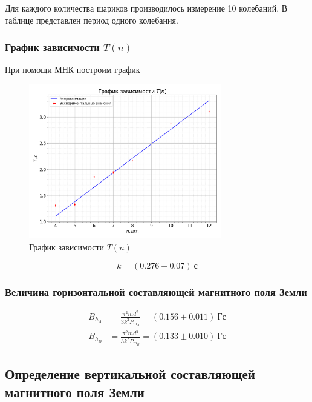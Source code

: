 \documentclass[a4paper, 12pt]{article}
\begin{document}
                Для каждого количества шариков производилось измерение 10 колебаний. В таблице представлен период одного колебания.

            \subsubsection{График зависимости $T(n)$}

                При помощи МНК построим график

                \begin{figure}[!ht]
                    \centering
                    \includegraphics[width=0.75\textwidth]{img/horizontal.png}
                    \caption{График зависимости $T(n)$}
                    \label{plot:n_T_horizontal}
                \end{figure}

                $$
                    k = (0.276 \pm 0.07)~с
                $$

            \subsubsection{Величина горизонтальной составляющей магнитного поля Земли}

                \begin{align*}
                    B_{h_A} &= \frac{\pi^2md^2}{3k^2P_{m_A}} = (0.156 \pm 0.011)~Гс \\
                    B_{h_B} &= \frac{\pi^2md^2}{3k^2P_{m_B}} = (0.133 \pm 0.010)~Гс
                \end{align*}

        \subsection{Определение вертикальной составляющей магнитного поля Земли}
\end{document}
